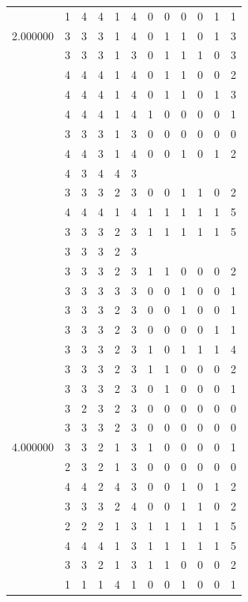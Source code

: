 \documentclass[]{book}
\theoremstyle{definition}
\theoremstyle{definition}
\theoremstyle{definition}
\theoremstyle{remark}
\begin{document}
\begin{table}
{\begin{tabular}[t]{rrrrrrrrrrrr}
 & 1 & 4 & 4 & 1 & 4 & 0 & 0 & 0 & 0 & 1 & 1\\
2.000000 & 3 & 3 & 3 & 1 & 4 & 0 & 1 & 1 & 0 & 1 & 3\\
 & 3 & 3 & 3 & 1 & 3 & 0 & 1 & 1 & 1 & 0 & 3\\
 & 4 & 4 & 4 & 1 & 4 & 0 & 1 & 1 & 0 & 0 & 2\\
 & 4 & 4 & 4 & 1 & 4 & 0 & 1 & 1 & 0 & 1 & 3\\
 & 4 & 4 & 4 & 1 & 4 & 1 & 0 & 0 & 0 & 0 & 1\\
 & 3 & 3 & 3 & 1 & 3 & 0 & 0 & 0 & 0 & 0 & 0\\
 & 4 & 4 & 3 & 1 & 4 & 0 & 0 & 1 & 0 & 1 & 2\\
 & 4 & 3 & 4 & 4 & 3 &  &  &  &  &  & \\
 & 3 & 3 & 3 & 2 & 3 & 0 & 0 & 1 & 1 & 0 & 2\\
 & 4 & 4 & 4 & 1 & 4 & 1 & 1 & 1 & 1 & 1 & 5\\
 & 3 & 3 & 3 & 2 & 3 & 1 & 1 & 1 & 1 & 1 & 5\\
 & 3 & 3 & 3 & 2 & 3 &  &  &  &  &  & \\
 & 3 & 3 & 3 & 2 & 3 & 1 & 1 & 0 & 0 & 0 & 2\\
 & 3 & 3 & 3 & 3 & 3 & 0 & 0 & 1 & 0 & 0 & 1\\
 & 3 & 3 & 3 & 2 & 3 & 0 & 0 & 1 & 0 & 0 & 1\\
 & 3 & 3 & 3 & 2 & 3 & 0 & 0 & 0 & 0 & 1 & 1\\
 & 3 & 3 & 3 & 2 & 3 & 1 & 0 & 1 & 1 & 1 & 4\\
 & 3 & 3 & 3 & 2 & 3 & 1 & 1 & 0 & 0 & 0 & 2\\
 & 3 & 3 & 3 & 2 & 3 & 0 & 1 & 0 & 0 & 0 & 1\\
 & 3 & 2 & 3 & 2 & 3 & 0 & 0 & 0 & 0 & 0 & 0\\
 & 3 & 3 & 3 & 2 & 3 & 0 & 0 & 0 & 0 & 0 & 0\\
4.000000 & 3 & 3 & 2 & 1 & 3 & 1 & 0 & 0 & 0 & 0 & 1\\
 & 2 & 3 & 2 & 1 & 3 & 0 & 0 & 0 & 0 & 0 & 0\\
 & 4 & 4 & 2 & 4 & 3 & 0 & 0 & 1 & 0 & 1 & 2\\
 & 3 & 3 & 3 & 2 & 4 & 0 & 0 & 1 & 1 & 0 & 2\\
 & 2 & 2 & 2 & 1 & 3 & 1 & 1 & 1 & 1 & 1 & 5\\
 & 4 & 4 & 4 & 1 & 3 & 1 & 1 & 1 & 1 & 1 & 5\\
 & 3 & 3 & 2 & 1 & 3 & 1 & 1 & 0 & 0 & 0 & 2\\
 & 1 & 1 & 1 & 4 & 1 & 0 & 0 & 1 & 0 & 0 & 1\\

\end{tabular}}
\end{table}
\end{document}

